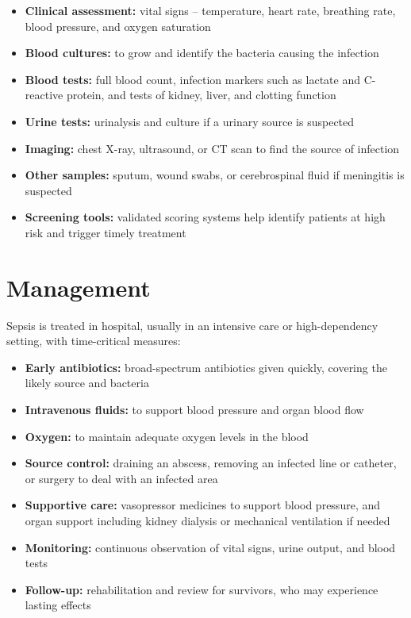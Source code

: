 \begin{itemize}
    \item \textbf{Clinical assessment:} vital signs -- temperature, heart rate, breathing rate, blood pressure, and oxygen saturation
    \item \textbf{Blood cultures:} to grow and identify the bacteria causing the infection
    \item \textbf{Blood tests:} full blood count, infection markers such as lactate and C-reactive protein, and tests of kidney, liver, and clotting function
    \item \textbf{Urine tests:} urinalysis and culture if a urinary source is suspected
    \item \textbf{Imaging:} chest X-ray, ultrasound, or CT scan to find the source of infection
    \item \textbf{Other samples:} sputum, wound swabs, or cerebrospinal fluid if meningitis is suspected
    \item \textbf{Screening tools:} validated scoring systems help identify patients at high risk and trigger timely treatment
\end{itemize}

\section*{Management}
Sepsis is treated in hospital, usually in an intensive care or high-dependency setting, with time-critical measures:

\begin{itemize}
    \item \textbf{Early antibiotics:} broad-spectrum antibiotics given quickly, covering the likely source and bacteria
    \item \textbf{Intravenous fluids:} to support blood pressure and organ blood flow
    \item \textbf{Oxygen:} to maintain adequate oxygen levels in the blood
    \item \textbf{Source control:} draining an abscess, removing an infected line or catheter, or surgery to deal with an infected area
    \item \textbf{Supportive care:} vasopressor medicines to support blood pressure, and organ support including kidney dialysis or mechanical ventilation if needed
    \item \textbf{Monitoring:} continuous observation of vital signs, urine output, and blood tests
    \item \textbf{Follow-up:} rehabilitation and review for survivors, who may experience lasting effects
\end{itemize}

